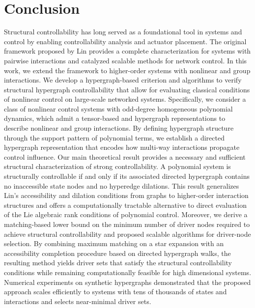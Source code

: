 \documentclass[journal,twoside,web]{ieeecolor}
\begin{document}
\section{Conclusion}\label{sec:5}
Structural controllability has long served as a foundational tool in systems and control by enabling controllability analysis and actuator placement.
%
The original framework proposed by Lin provides a complete characterization for systems with pairwise interactions and catalyzed scalable methods for network control.
%
In this work, we extend the framework to higher-order systems with nonlinear and group interactions.
%
We develop a hypergraph-based criterion and algorithms to verify structural hypergraph controllability that allow for evaluating classical conditions of nonlinear control on large-scale networked systems. Specifically, we consider a class of nonlinear control systems with odd-degree homogeneous polynomial dynamics, which admit a tensor-based and hypergraph representations to describe nonlinear and group interactions.
%
By defining hypergraph structure through the support pattern of polynomial terms, we establish a directed hypergraph representation that encodes how multi-way interactions propagate control influence.
%
Our main theoretical result provides a necessary and sufficient structural characterization of strong controllability. A polynomial system is structurally controllable if and only if its associated directed hypergraph contains no inaccessible state nodes and no hyperedge dilations.
%
This result generalizes Lin’s accessibility and dilation conditions from graphs to higher-order interaction structures and offers a computationally tractable alternative to direct evaluation of the Lie algebraic rank conditions of polynomial control.
%
Moreover, we derive a matching-based lower bound on the minimum number of driver nodes required to achieve structural controllability and proposed scalable algorithms for driver-node selection.
%
By combining maximum matching on a star expansion with an accessibility completion procedure based on directed hypergraph walks, the resulting method yields driver sets that satisfy the structural controllability conditions while remaining computationally feasible for high dimensional systems.
%
Numerical experiments on synthetic hypergraphs demonstrated that the proposed approach scales efficiently to systems with tens of thousands of states and interactions and selects near-minimal driver sets.
\end{document}
